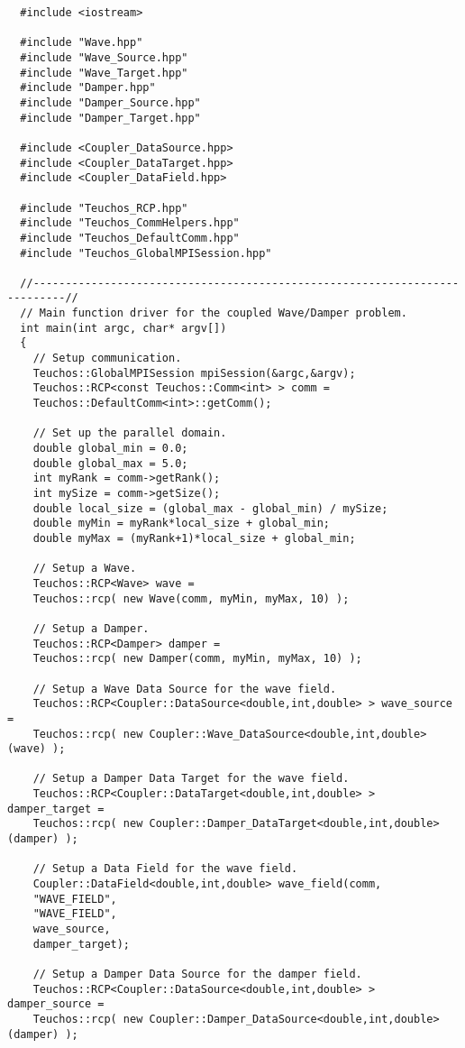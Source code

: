 \documentclass[letterpaper]{article}
\begin{document}
\begin{lstlisting}
  #include <iostream>

  #include "Wave.hpp"
  #include "Wave_Source.hpp"
  #include "Wave_Target.hpp"
  #include "Damper.hpp"
  #include "Damper_Source.hpp"
  #include "Damper_Target.hpp"

  #include <Coupler_DataSource.hpp>
  #include <Coupler_DataTarget.hpp>
  #include <Coupler_DataField.hpp>

  #include "Teuchos_RCP.hpp"
  #include "Teuchos_CommHelpers.hpp"
  #include "Teuchos_DefaultComm.hpp"
  #include "Teuchos_GlobalMPISession.hpp"

  //---------------------------------------------------------------------------//
  // Main function driver for the coupled Wave/Damper problem.
  int main(int argc, char* argv[])
  {
    // Setup communication.
    Teuchos::GlobalMPISession mpiSession(&argc,&argv);
    Teuchos::RCP<const Teuchos::Comm<int> > comm = 
    Teuchos::DefaultComm<int>::getComm();

    // Set up the parallel domain.
    double global_min = 0.0;
    double global_max = 5.0;
    int myRank = comm->getRank();
    int mySize = comm->getSize();
    double local_size = (global_max - global_min) / mySize;
    double myMin = myRank*local_size + global_min;
    double myMax = (myRank+1)*local_size + global_min;

    // Setup a Wave.
    Teuchos::RCP<Wave> wave =
    Teuchos::rcp( new Wave(comm, myMin, myMax, 10) );

    // Setup a Damper.
    Teuchos::RCP<Damper> damper =
    Teuchos::rcp( new Damper(comm, myMin, myMax, 10) ); 

    // Setup a Wave Data Source for the wave field.
    Teuchos::RCP<Coupler::DataSource<double,int,double> > wave_source = 
    Teuchos::rcp( new Coupler::Wave_DataSource<double,int,double>(wave) );

    // Setup a Damper Data Target for the wave field.
    Teuchos::RCP<Coupler::DataTarget<double,int,double> > damper_target = 
    Teuchos::rcp( new Coupler::Damper_DataTarget<double,int,double>(damper) );

    // Setup a Data Field for the wave field.
    Coupler::DataField<double,int,double> wave_field(comm,
    "WAVE_FIELD",
    "WAVE_FIELD",
    wave_source,
    damper_target);

    // Setup a Damper Data Source for the damper field.
    Teuchos::RCP<Coupler::DataSource<double,int,double> > damper_source = 
    Teuchos::rcp( new Coupler::Damper_DataSource<double,int,double>(damper) );


\end{lstlisting}
\end{document}
